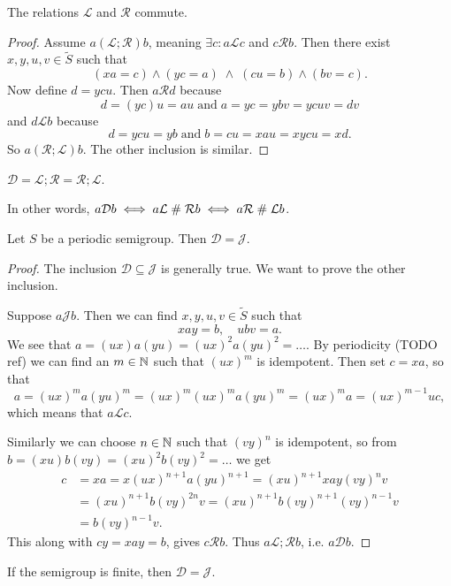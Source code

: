 \begin{proposition}
The relations $\mathcal{L}$ and $\mathcal{R}$ commute.
\end{proposition}
\begin{proof}
Assume $a(\mathcal{L};\mathcal{R})b$, meaning $\exists c: a\mathcal{L}c$ and $c\mathcal{R}b$. Then there exist $x,y,u,v\in \widetilde{S}$ such that
\[ (xa = c) \land (yc = a) \;\land\; (cu = b) \land (bv = c). \]
Now define $d = ycu$. Then $a\mathcal{R}d$ because
\[ d = (yc)u = au \;\text{and}\; a = yc = ybv = ycuv = dv \]
and $d\mathcal{L}b$ because
\[ d = ycu = yb \;\text{and}\; b = cu = xau = xycu = xd. \]
So $a(\mathcal{R};\mathcal{L})b$. The other inclusion is similar.
\end{proof}
\begin{corollary}
$\mathcal{D} = \mathcal{L};\mathcal{R} = \mathcal{R};\mathcal{L}$.
\end{corollary}
In other words, $a\mathcal{D}b \iff a\mathcal{L} \mathrel{\#} \mathcal{R}b \iff a\mathcal{R} \mathrel{\#} \mathcal{L}b$.

\begin{proposition}
Let $S$ be a periodic semigroup. Then $\mathcal{D} = \mathcal{J}$.
\end{proposition}
\begin{proof}
The inclusion $\mathcal{D} \subseteq \mathcal{J}$ is generally true. We want to prove the other inclusion.

Suppose $a\mathcal{J}b$. Then we can find $x,y,u,v\in \widetilde{S}$ such that
\[ xay = b, \quad ubv = a. \]
We see that $a = (ux)a(yu) = (ux)^2a(yu)^2 = \ldots$. By periodicity (TODO ref) we can find an $m\in \mathbb{N}$ such that $(ux)^m$ is idempotent. Then set $c= xa$, so that
\[ a = (ux)^ma(yu)^m = (ux)^m(ux)^ma(yu)^m = (ux)^ma = (ux)^{m-1}uc, \]
which means that $a\mathcal{L}c$.

Similarly we can choose $n\in \mathbb{N}$ such that $(vy)^n$ is idempotent, so from $b = (xu)b(vy) = (xu)^2b(vy)^2 = \ldots$
we get
\begin{align*}
c &= xa = x(ux)^{n+1}a(yu)^{n+1} = (xu)^{n+1}xay(vy)^nv \\
&= (xu)^{n+1}b(vy)^{2n}v = (xu)^{n+1}b(vy)^{n+1}(vy)^{n-1}v \\
&= b(vy)^{n-1}v.
\end{align*}
This along with $cy = xay = b$, gives $c\mathcal{R}b$. Thus $a\mathcal{L};\mathcal{R}b$, i.e. $a\mathcal{D}b$.
\end{proof}
\begin{corollary}
If the semigroup is finite, then $\mathcal{D} = \mathcal{J}$.
\end{corollary}

